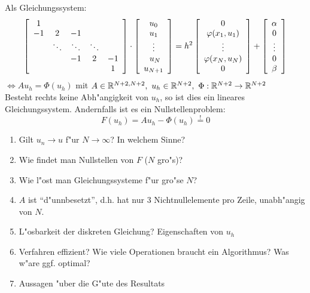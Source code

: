 \documentclass{scrartcl}
\begin{document}
Als Gleichungssystem:
$$
\left[
\begin{array}{c c c c c}
1 & & & & \\
-1 & 2 & -1 & & \\
   & \ddots  &  \ddots  & \ddots  &  \\
 & & -1 & 2 & -1 \\
 & &    &   & 1 
\end{array}
\right]
\cdot 
\left[
\begin{array}{c}
u_0 \\ u_1 \\ \vdots \\\ u_N \\ u_{N+1}
\end{array}
\right]
=
h^2
\left[
\begin{array}{c}
0 \\ \varphi(x_1, u_1) \\ \vdots \\ \varphi(x_N, u_N) \\ 0
\end{array}
\right]
+
\left[
\begin{array}{c}
\alpha \\ 0 \\ \vdots \\ 0 \\ \beta 
\end{array}
\right]
$$
$\Leftrightarrow A u_h = \Phi(u_h)$ mit $A \in \mathbb{R}^{N+2, N+2}, \ u_h \in \mathbb{R}^{N+2}, \ \Phi: \mathbb{R}^{N+2} \rightarrow \mathbb{R}^{N+2}$ \\
Besteht rechts keine Abh"angigkeit von $u_h$, so ist dies ein lineares Gleichungssystem. Andernfalls ist es ein Nullstellenproblem:
$$ F(u_h) = A u_h - \Phi(u_h) \stackrel{!}{=} 0$$

\begin{enumerate}
\item Gilt $u_n \rightarrow u$ f"ur $N \rightarrow \infty$? In welchem Sinne?
\item Wie findet man Nullstellen von $F$ ($N$ gro"s)?
\item Wie l"ost man Gleichungssysteme f"ur gro"se $N$?
\item $A$ ist "`d"unnbesetzt"', d.h. hat nur 3 Nichtnullelemente pro Zeile, unabh"angig von $N$.
\item L"osbarkeit der diskreten Gleichung? Eigenschaften von $u_h$
\item Verfahren effizient? Wie viele Operationen braucht ein Algorithmus? Was w"are ggf. optimal?
\item Aussagen "uber die G"ute des Resultats
\end{enumerate}
\end{document}
